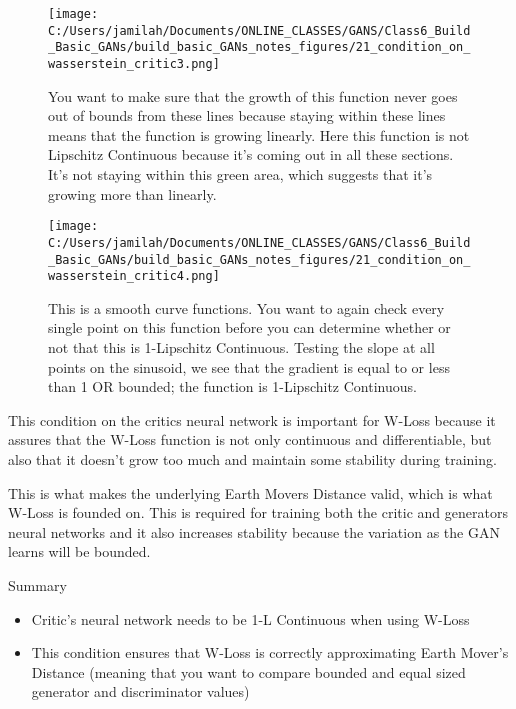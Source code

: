 \documentclass[11pt, onecolumn]{article}
\begin{document}
\begin{figure}[htp]
\begin{center}
\texttt{[image: C:/Users/jamilah/Documents/ONLINE\_CLASSES/GANS/Class6\_Build\_Basic\_GANs/build\_basic\_GANs\_notes\_figures/21\_condition\_on\_wasserstein\_critic3.png]}
\end{center}
\caption{You want to make sure that the growth of this function never goes out of bounds from these lines because staying within these lines means that the function is growing linearly. Here this function is not Lipschitz Continuous because it's coming out in all these sections. It's not staying within this green area, which suggests that it's growing more than linearly.}
\label{21_condition_on_wasserstein_critic3}
\end{figure}

\begin{figure}[htp]
\begin{center}
\texttt{[image: C:/Users/jamilah/Documents/ONLINE\_CLASSES/GANS/Class6\_Build\_Basic\_GANs/build\_basic\_GANs\_notes\_figures/21\_condition\_on\_wasserstein\_critic4.png]}
\end{center}
\caption{This is a smooth curve functions. You want to again check every single point on this function before you can determine whether or not that this is 1-Lipschitz Continuous. Testing the slope at all points on the sinusoid, we see that the gradient is equal to or less than 1 OR bounded; the function is 1-Lipschitz Continuous.}
\label{21_condition_on_wasserstein_critic4}
\end{figure}

This condition on the critics neural network is important for W-Loss because it assures that the W-Loss function is not only continuous and differentiable, but also that it doesn't grow too much and maintain some stability during training.

This is what makes the underlying Earth Movers Distance valid, which is what W-Loss is founded on. This is required for training both the critic and generators neural networks and it also increases stability because
the variation as the GAN learns will be bounded.

Summary
\begin{itemize}
\item Critic's neural network needs to be 1-L Continuous when using W-Loss
\item This condition ensures that W-Loss is correctly approximating Earth Mover's Distance (meaning that you want to compare bounded and equal sized generator and discriminator values)
\end{itemize}
\end{document}
